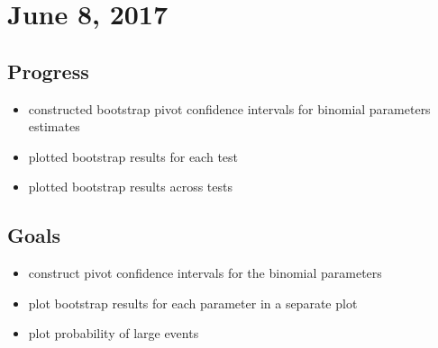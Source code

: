 \documentclass{article}
\begin{document}
\section{June 8, 2017}
\subsection{Progress}
\begin{itemize}
  \item constructed bootstrap pivot confidence intervals for binomial parameters estimates
  \item plotted bootstrap results for each test
  \item plotted bootstrap results across tests
\end{itemize}

\subsection{Goals}
\begin{itemize}
  \item construct pivot confidence intervals for the binomial parameters
  \item plot bootstrap results for each parameter in a separate plot
  \item plot probability of large events
\end{itemize}



\end{document}
